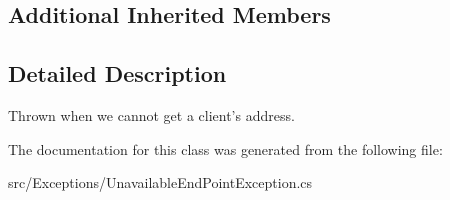 \subsection*{Additional Inherited Members}


\subsection{Detailed Description}
Thrown when we cannot get a client's address. 

The documentation for this class was generated from the following file\-:\begin{DoxyCompactItemize}
\item 
src/\-Exceptions/Unavailable\-End\-Point\-Exception.\-cs\end{DoxyCompactItemize}
